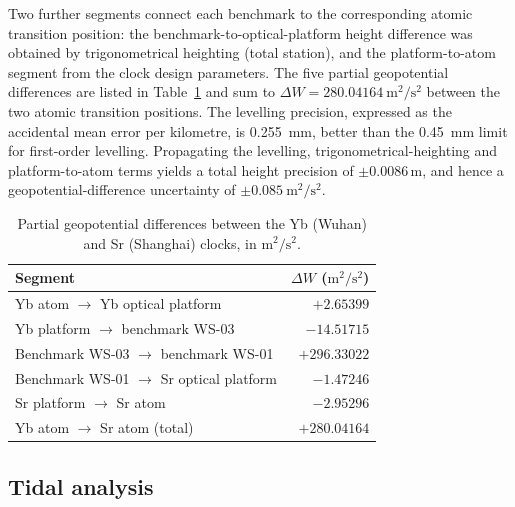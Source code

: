 \documentclass[11pt,a4paper]{article}
\newcommand{\dW}{\Delta W}
\begin{document}
Two further segments connect each benchmark to the corresponding atomic
transition position: the benchmark-to-optical-platform height difference
was obtained by trigonometrical heighting (total station), and the
platform-to-atom segment from the clock design parameters. The five
partial geopotential differences are listed in Table~\ref{tab:levelling}
and sum to $\dW = 280.04164\ \mathrm{m^{2}/s^{2}}$ between the two atomic
transition positions. The levelling precision, expressed as the
accidental mean error per kilometre, is \qty{0.255}{mm}, better than the
\qty{0.45}{mm} limit for first-order levelling. Propagating the levelling,
trigonometrical-heighting and platform-to-atom terms yields a total
height precision of $\pm0.0086$\,m, and hence a geopotential-difference
uncertainty of $\pm0.085\ \mathrm{m^{2}/s^{2}}$.

\begin{table}[t]
  \centering
  \caption{Partial geopotential differences between the Yb (Wuhan) and
  Sr (Shanghai) clocks, in $\mathrm{m^{2}/s^{2}}$.}
  \label{tab:levelling}
  \begin{tabular}{lr}
    \toprule
    Segment & $\Delta W$ ($\mathrm{m^{2}/s^{2}}$) \\
    \midrule
    Yb atom $\to$ Yb optical platform        & $+2.65399$ \\
    Yb platform $\to$ benchmark WS-03        & $-14.51715$ \\
    Benchmark WS-03 $\to$ benchmark WS-01    & $+296.33022$ \\
    Benchmark WS-01 $\to$ Sr optical platform & $-1.47246$ \\
    Sr platform $\to$ Sr atom                & $-2.95296$ \\
    \midrule
    Yb atom $\to$ Sr atom (total)            & $+280.04164$ \\
    \bottomrule
  \end{tabular}
\end{table}



\subsection{Tidal analysis}
\label{app:tidal}
\end{document}
